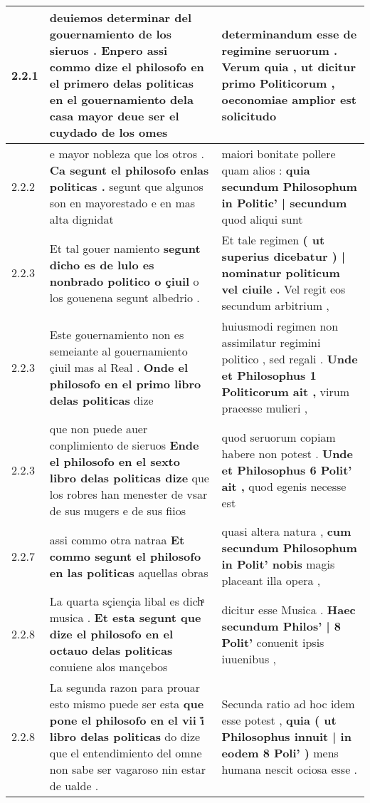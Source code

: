 \begin{tabular}{|p{1cm}|p{6.5cm}|p{6.5cm}|}
2.2.1 & deuiemos determinar del gouernamiento de los sieruos . \textbf{ Enpero assi commo dize el philosofo en el primero delas politicas en el gouernamiento dela } casa mayor deue ser el cuydado de los omes & determinandum esse de regimine seruorum . Verum quia , \textbf{ ut dicitur primo Politicorum , } oeconomiae amplior est solicitudo \\\hline
2.2.2 & e mayor nobleza que los otros . \textbf{ Ca segunt el philosofo enlas politicas . } segunt que algunos son en mayorestado e en mas alta dignidat & maiori bonitate pollere quam alios : \textbf{ quia secundum Philosophum in Politic’ | secundum } quod aliqui sunt \\\hline
2.2.3 & Et tal gouer namiento \textbf{ segunt dicho es de lulo es nonbrado politico o çiuil } o los gouenena segunt albedrio . & Et tale regimen \textbf{ ( ut superius dicebatur ) | nominatur politicum vel ciuile . } Vel regit eos secundum arbitrium , \\\hline
2.2.3 & Este gouernamiento non es semeiante al gouernamiento çiuil mas al Real . \textbf{ Onde el philosofo en el primo libro delas politicas } dize & huiusmodi regimen non assimilatur regimini politico , sed regali . \textbf{ Unde et Philosophus 1 Politicorum ait , } virum praeesse mulieri , \\\hline
2.2.3 & que non puede auer conplimiento de sieruos \textbf{ Ende el philosofo en el sexto libro delas politicas dize } que los robres han menester de vsar de sus mugers e de sus fiios & quod seruorum copiam habere non potest . \textbf{ Unde et Philosophus 6 Polit’ ait , } quod egenis necesse est \\\hline
2.2.7 & assi commo otra natraa \textbf{ Et commo segunt el philosofo en las politicas } aquellas obras & quasi altera natura , \textbf{ cum secundum Philosophum in Polit’ nobis } magis placeant illa opera , \\\hline
2.2.8 & La quarta sçiençia libal es dichͣ musica . \textbf{ Et esta segunt que dize el philosofo en el octauo delas politicas } conuiene alos mançebos & dicitur esse Musica . \textbf{ Haec secundum Philos’ | 8 Polit’ } conuenit ipsis iuuenibus , \\\hline
2.2.8 & La segunda razon para prouar esto mismo puede ser esta \textbf{ que pone el philosofo en el vii i̊ libro delas politicas } do dize que el entendimiento del omne non sabe ser vagaroso nin estar de ualde . & Secunda ratio ad hoc idem esse potest , \textbf{ quia ( ut Philosophus innuit | in eodem 8 Poli’ ) } mens humana nescit ociosa esse . \\\hline

\end{tabular}
